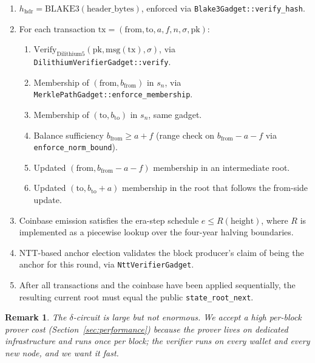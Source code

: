 \documentclass[11pt,a4paper]{article}
\newtheorem{remark}{Remark}
\begin{document}
\begin{enumerate}[leftmargin=*]
  \item $h_{\mathrm{hdr}} = \mathrm{BLAKE3}(\mathrm{header\_bytes})$,
        enforced via \texttt{Blake3Gadget::verify\_hash}.
  \item For each transaction $\mathrm{tx} = (\mathrm{from}, \mathrm{to}, a, f, n, \sigma, \mathrm{pk})$:
        \begin{enumerate}[label*=(\alph*),leftmargin=*]
          \item $\mathrm{Verify}_{\mathrm{Dilithium5}}(\mathrm{pk}, \mathrm{msg}(\mathrm{tx}), \sigma)$,
                via \texttt{DilithiumVerifierGadget::verify}.
          \item Membership of $(\mathrm{from}, b_{\mathrm{from}})$ in $s_n$, via
                \texttt{MerklePathGadget::enforce\_membership}.
          \item Membership of $(\mathrm{to}, b_{\mathrm{to}})$ in $s_n$, same gadget.
          \item Balance sufficiency $b_{\mathrm{from}} \ge a + f$
                (range check on $b_{\mathrm{from}} - a - f$ via \texttt{enforce\_norm\_bound}).
          \item Updated $(\mathrm{from}, b_{\mathrm{from}} - a - f)$ membership in
                an intermediate root.
          \item Updated $(\mathrm{to}, b_{\mathrm{to}} + a)$ membership in the
                root that follows the from-side update.
        \end{enumerate}
  \item Coinbase emission satisfies the era-step schedule
        $e \le R(\mathrm{height})$, where $R$ is implemented as a piecewise
        lookup over the four-year halving boundaries.
  \item NTT-based anchor election validates the block producer's claim
        of being the anchor for this round, via \texttt{NttVerifierGadget}.
  \item After all transactions and the coinbase have been applied
        sequentially, the resulting current root must equal the public
        \texttt{state\_root\_next}.
\end{enumerate}

\begin{remark}
\label{rem:perblockfreshness}
The $\delta$-circuit is large but not enormous. We accept a high per-block
prover cost (Section~\ref{sec:performance}) because the prover lives
on dedicated infrastructure and runs once per block; the verifier runs
on every wallet and every new node, and we want it fast.
\end{remark}
\end{document}
